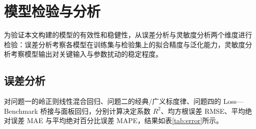 \section{模型检验与分析}

为验证本文构建的模型的有效性和稳健性，从误差分析与灵敏度分析两个维度进行检验：误差分析考察各模型在训练集与检验集上的拟合精度与泛化能力，灵敏度分析考察模型输出对关键输入与参数扰动的稳定程度。

\subsection{误差分析}
\label{sec:check}

对问题一的岭正则线性混合回归、问题二的经典/广义标度律、问题四的 Loss—Benchmark 桥接与面板回归，分别计算决定系数 $R^2$、均方根误差 RMSE、平均绝对误差 MAE 与平均绝对百分比误差 MAPE，结果如表\ref{tab:error}所示。

